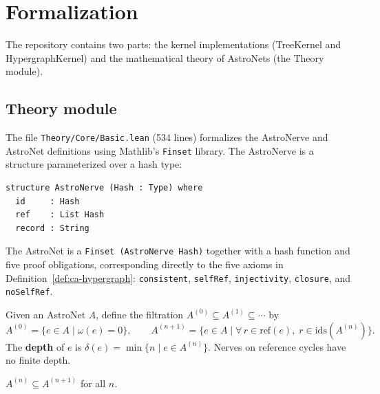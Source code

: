 \section{Formalization}\label{sec:formalization}

The repository contains two parts: the kernel implementations (TreeKernel and HypergraphKernel) and the mathematical theory of AstroNets (the Theory module).

\subsection{Theory module}

The file \texttt{Theory/Core/Basic.lean} (534 lines) formalizes the AstroNerve and AstroNet definitions using Mathlib's \texttt{Finset} library.  The AstroNerve is a structure parameterized over a hash type:

\begin{lstlisting}[language={},morekeywords={structure,where,deriving}]
structure AstroNerve (Hash : Type) where
  id     : Hash
  ref    : List Hash
  record : String
\end{lstlisting}

The AstroNet is a \texttt{Finset (AstroNerve Hash)} together with a hash function and five proof obligations, corresponding directly to the five axioms in Definition~\ref{def:ca-hypergraph}: \texttt{consistent}, \texttt{selfRef}, \texttt{injectivity}, \texttt{closure}, and \texttt{noSelfRef}.

\begin{definition}
Given an AstroNet $A$, define the filtration $A^{(0)} \subseteq A^{(1)} \subseteq \cdots$ by
\[
  A^{(0)} = \{ e \in A \mid \omega(e) = 0 \}, \qquad
  A^{(n+1)} = \{ e \in A \mid \forall\, r \in \mathrm{ref}(e),\; r \in \mathrm{ids}(A^{(n)}) \}.
\]
The \textbf{depth} of $e$ is $\delta(e) = \min\{n \mid e \in A^{(n)}\}$.  Nerves on reference cycles have no finite depth.
\end{definition}

\begin{theorem}[Monotonicity]
$A^{(n)} \subseteq A^{(n+1)}$ for all $n$.
\end{theorem}


